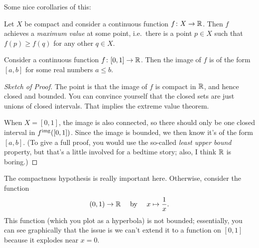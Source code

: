 Some nice corollaries of this:
\begin{corollary}
	Let $X$ be compact and consider a continuous function $f \colon X \to \mathbb R$.
	Then $f$ achieves a \emph{maximum value} at some point,
	i.e.\ there is a point $p \in X$ such that $f(p) \ge f(q)$ for any
	other $q \in X$.
\end{corollary}
\begin{corollary}
	Consider a continuous function $f \colon [0,1] \to \mathbb R$.
	Then the image of $f$ is of the form $[a,b]$ for some real numbers $a \le b$.
\end{corollary}

\begin{proof}[Sketch of Proof]
	The point is that the image of $f$ is compact in $\mathbb R$,
	and hence closed and bounded.
	You can convince yourself that the closed sets are just unions of closed intervals.
	That implies the extreme value theorem.

	When $X=[0,1]$, the image is also connected,
	so there should only be one closed interval in $f^{\text{img}}([0,1])$.
	Since the image is bounded, we then know it's of the form $[a,b]$.
	(To give a full proof, you would use the so-called \emph{least upper bound}
	property, but that's a little involved for a bedtime story;
	also, I think $\mathbb R$ is boring.)
\end{proof}

\begin{example}
	[$1/x$]
	The compactness hypothesis is really important here.
	Otherwise, consider the function
	\[ (0,1) \to \mathbb R \quad \text{ by } \quad
		x \mapsto \frac 1x. \]
	This function (which you plot as a hyperbola) is not bounded;
	essentially, you can see graphically that the issue
	is we can't extend it to a function on $[0,1]$ because it explodes near $x=0$.
\end{example}

